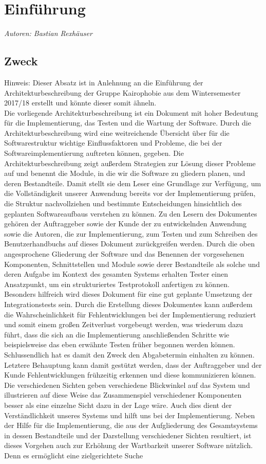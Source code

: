 \documentclass[enabledeprecatedfontcommands,fontsize=11pt,paper=a4,twoside]{scrartcl}
\newcounter{one}
\begin{document}
\newpage
\section{Einführung}
\emph{Autoren: Bastian Rexhäuser}
\subsection{Zweck}
Hinweis: Dieser Absatz ist in Anlehnung an die Einführung der Architekturbeschreibung der Gruppe Kairophobie aus dem Wintersemester 2017/18 erstellt und könnte dieser somit ähneln. \\
Die vorliegende Architekturbeschreibung ist ein Dokument mit hoher Bedeutung für die Implementierung, das Testen und die Wartung der Software. Durch die Architekturbeschreibung wird eine weitreichende Übersicht über für die Softwarestruktur wichtige Einflussfaktoren und Probleme, die bei der Softwareimplementierung auftreten können, gegeben. Die Architekturbeschreibung zeigt außerdem Strategien zur Lösung dieser Probleme auf und benennt die Module, in die wir die Software zu gliedern planen, und deren Bestandteile. Damit stellt sie dem Leser eine Grundlage zur Verfügung, um die Vollständigkeit unserer Anwendung bereits vor der Implementierung prüfen, die Struktur nachvollziehen und bestimmte Entscheidungen hinsichtlich des geplanten Softwareaufbaus verstehen zu können. Zu den Lesern des Dokumentes gehören der Auftraggeber sowie der Kunde der zu entwickelnden Anwendung sowie die Autoren, die zur Implementierung, zum Testen und zum Schreiben des Benutzerhandbuchs auf dieses Dokument zurückgreifen werden. Durch die oben angesprochene Gliederung der Software und das Benennen der vorgesehenen Komponenten, Schnittstellen und Module sowie derer Bestandteile als solche und deren Aufgabe im Kontext des gesamten Systems erhalten Tester einen Ansatzpunkt, um ein strukturiertes Testprotokoll anfertigen zu können. Besonders hilfreich wird dieses Dokument für eine gut geplante Umsetzung der Integrationstests sein. Durch die Erstellung dieses Dokumentes kann außerdem die Wahrscheinlichkeit für Fehlentwicklungen bei der Implementierung reduziert und somit einem großen Zeitverlust vorgebeugt werden, was wiederum dazu führt, dass die sich an die Implementierung anschließenden Schritte wie beispielsweise das eben erwähnte Testen früher begonnen werden können. Schlussendlich hat es damit den Zweck den Abgabetermin einhalten zu können. Letztere Behauptung kann damit gestützt werden,  dass der Auftraggeber und der Kunde Fehlentwicklungen frühzeitig erkennen und diese kommunizieren können. Die verschiedenen Sichten geben verschiedene Blickwinkel auf das System und illustrieren auf diese Weise das Zusammenspiel verschiedener Komponenten besser als eine einzelne Sicht dazu in der Lage wäre. Auch dies dient der Verständlichkeit unseres Systems und hilft uns bei der Implementierung. Neben der Hilfe für die Implementierung, die aus der Aufgliederung des Gesamtsystems in dessen Bestandteile und der Darstellung verschiedener Sichten resultiert, ist dieses Vorgehen auch zur Erhöhung der Wartbarkeit unserer Software nützlich. Denn es ermöglicht eine zielgerichtete Suche 
\end{document}
